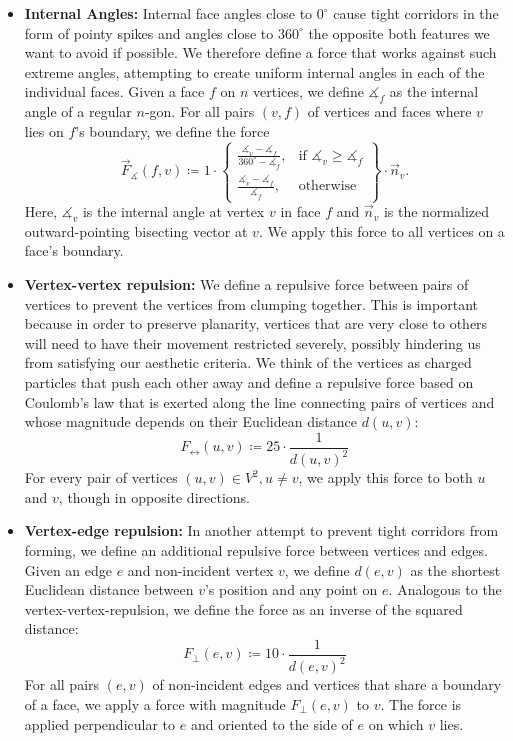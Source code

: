 \begin{itemize}
\item \textbf{Internal Angles:}
Internal face angles close to $0^\circ$ cause tight corridors in the form of pointy spikes and angles close to $360^\circ$ the opposite \emdash{} both features we want to avoid if possible.
We therefore define a force that works against such extreme angles, attempting to create uniform internal angles in each of the individual faces.
Given a face $f$ on $n$ vertices, we define $\measuredangle_f$ as the internal angle of a regular $n$-gon.
For all pairs $(v,f)$ of vertices and faces where $v$ lies on $f$'s boundary, we define the force
\begin{equation}
	\vec{F}_\measuredangle(f,v) \coloneqq 1 \cdot \left\{\begin{array}{lr}
		\frac{\measuredangle_v - \measuredangle_f}{360^\circ - \measuredangle_f}, & \text{if } \measuredangle_v \geq \measuredangle_f\\
		\frac{\measuredangle_v - \measuredangle_f}{\measuredangle_f}, & \text{otherwise}\end{array}
	\right\} \cdot \vec{n}_v.
\end{equation}
Here, $\measuredangle_v$ is the internal angle at vertex $v$ in face $f$ and $\vec{n}_v$ is the normalized outward-pointing bisecting vector at $v$.
We apply this force to all vertices on a face's boundary.

\item \textbf{Vertex-vertex repulsion:}
We define a repulsive force between pairs of vertices to prevent the vertices from clumping together.
This is important because in order to preserve planarity, vertices that are very close to others will need to have their movement restricted severely, possibly hindering us from satisfying our aesthetic criteria.
We think of the vertices as charged particles that push each other away and define a repulsive force based on Coulomb's law that is exerted along the line connecting pairs of vertices and whose magnitude depends on their Euclidean distance $d(u,v)$:
\begin{equation}
	F_\leftrightarrow(u,v) \coloneqq 25 \cdot \frac{1}{d(u,v)^2}
\end{equation}
For every pair of vertices $(u, v) \in V^2, u \neq v$, we apply this force to both $u$ and $v$, though in opposite directions.

\item \textbf{Vertex-edge repulsion:}
In another attempt to prevent tight corridors from forming, we define an additional repulsive force between vertices and edges.
Given an edge $e$ and non-incident vertex $v$, we define $d(e,v)$ as the shortest Euclidean distance between $v$'s position and any point on $e$.
Analogous to the vertex-vertex-repulsion, we define the force as an inverse of the squared distance:
\begin{equation}
	F_\bot(e,v) \coloneqq 10 \cdot \frac{1}{d(e,v)^2}
\end{equation}
For all pairs $(e,v)$ of non-incident edges and vertices that share a boundary of a face, we apply a force with magnitude $F_\bot(e,v)$ to $v$.
The force is applied perpendicular to $e$ and oriented to the side of $e$ on which $v$ lies.
\end{itemize}

